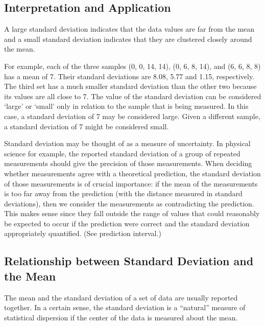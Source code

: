 \subsection{Interpretation and Application}

A large standard deviation indicates that the data values are far from the mean and a small standard deviation indicates that they are clustered closely around the mean.

For example, each of the three samples (0, 0, 14, 14), (0, 6, 8, 14), and (6, 6, 8, 8) has a mean of 7. Their standard deviations are 8.08, 5.77 and 1.15, respectively. The third set has a much smaller standard deviation than the other two because its values are all close to 7. The value of the standard deviation can be considered `large' or `small' only in relation to the sample that is being measured. In this case, a standard deviation of 7 may be considered large. Given a different sample, a standard deviation of 7 might be considered small.

Standard deviation may be thought of as a measure of uncertainty. In physical science for example, the reported standard deviation of a group of repeated measurements should give the precision of those measurements. When deciding whether measurements agree with a theoretical prediction, the standard deviation of those measurements is of crucial importance: if the mean of the measurements is too far away from the prediction (with the distance measured in standard deviations), then we consider the measurements as contradicting the prediction. This makes sense since they fall outside the range of values that could reasonably be expected to occur if the prediction were correct and the standard deviation appropriately quantified. (See prediction interval.)

\subsection{Relationship between Standard Deviation and the Mean}

The mean and the standard deviation of a set of data are usually reported together. In a certain sense, the standard deviation is a ``natural'' measure of statistical dispersion if the center of the data is measured about the mean. 

